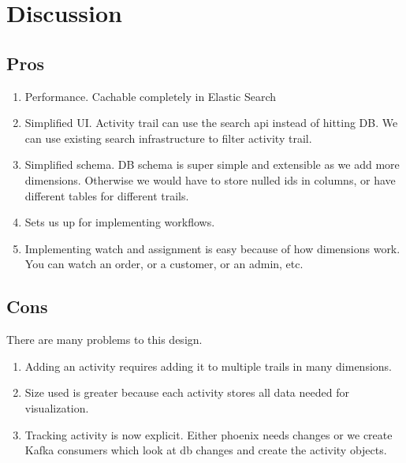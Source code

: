 \documentclass[11pt]{article}
\begin{document}
\section{Discussion}
\subsection{Pros}
\begin{enumerate}
    \item Performance. Cachable completely in Elastic Search
    \item Simplified UI. Activity trail can use the search api instead of hitting DB.
        We can use existing search infrastructure to filter activity trail.
    \item Simplified schema. DB schema is super simple and extensible as we add more dimensions.
        Otherwise we would have to store nulled ids in columns, or have different tables for
        different trails. 
    \item Sets us up for implementing workflows.
    \item Implementing watch and assignment is easy because of how dimensions work. You can
        watch an order, or a customer, or an admin, etc.
\end{enumerate}

\subsection{Cons}

There are many problems to this design.

\begin{enumerate}
    \item Adding an activity requires adding it to multiple trails in many dimensions. 
    \item Size used is greater because each activity stores all data needed for visualization.
    \item Tracking activity is now explicit. Either phoenix needs changes or we create
           Kafka consumers which look at db changes and create the activity objects.
\end{enumerate}
\end{document}
